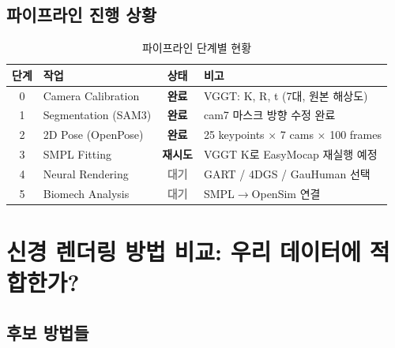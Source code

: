 \documentclass[11pt, a4paper]{report}
\begin{document}
\section{파이프라인 진행 상황}

\begin{table}[H]
\centering
\caption{파이프라인 단계별 현황}
\renewcommand{\arraystretch}{1.4}
\begin{tabular}{c p{4cm} c p{5.5cm}}
\toprule
\textbf{단계} & \textbf{작업} & \textbf{상태} & \textbf{비고} \\
\midrule
0 & Camera Calibration & \textcolor{thmgreen}{\textbf{완료}} & VGGT: K, R, t (7대, 원본 해상도) \\
1 & Segmentation (SAM3) & \textcolor{thmgreen}{\textbf{완료}} & cam7 마스크 방향 수정 완료 \\
2 & 2D Pose (OpenPose) & \textcolor{thmgreen}{\textbf{완료}} & 25 keypoints $\times$ 7 cams $\times$ 100 frames \\
3 & SMPL Fitting & \textcolor{noteorange}{\textbf{재시도}} & VGGT K로 EasyMocap 재실행 예정 \\
4 & Neural Rendering & \textcolor{gray}{\textbf{대기}} & GART / 4DGS / GauHuman 선택 \\
5 & Biomech Analysis & \textcolor{gray}{\textbf{대기}} & SMPL$\rightarrow$OpenSim 연결 \\
\bottomrule
\end{tabular}
\end{table}


\chapter{신경 렌더링 방법 비교: 우리 데이터에 적합한가?}

\section{후보 방법들}
\end{document}
